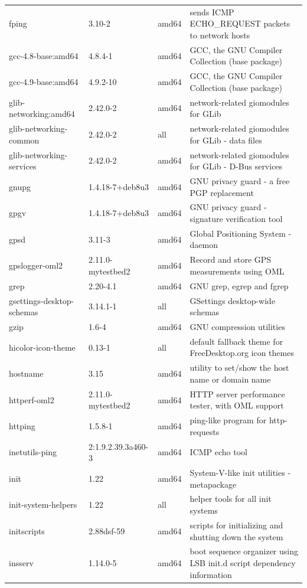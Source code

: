 \documentclass[a4paper,10pt]{article}
\begin{document}
\begin{appendices}
{\begin{longtable}{p{3.25cm}@{\hspace{0.25cm}}p{4cm}@{\hspace{0.25cm}}l@{\hspace{0.25cm}}p{7cm}}
fping	&	3.10-2	&	amd64	&	sends ICMP ECHO\_REQUEST packets to network hosts	\\
gcc-4.8-base:amd64	&	4.8.4-1	&	amd64	&	GCC, the GNU Compiler Collection (base package)	\\
gcc-4.9-base:amd64	&	4.9.2-10	&	amd64	&	GCC, the GNU Compiler Collection (base package)	\\
glib-networking:amd64	&	2.42.0-2	&	amd64	&	network-related giomodules for GLib	\\
glib-networking-common	&	2.42.0-2	&	all	&	network-related giomodules for GLib - data files	\\
glib-networking-services	&	2.42.0-2	&	amd64	&	network-related giomodules for GLib - D-Bus services	\\
gnupg	&	1.4.18-7+deb8u3	&	amd64	&	GNU privacy guard - a free PGP replacement	\\
gpgv	&	1.4.18-7+deb8u3	&	amd64	&	GNU privacy guard - signature verification tool	\\
gpsd	&	3.11-3	&	amd64	&	Global Positioning System - daemon	\\
gpslogger-oml2	&	2.11.0-mytestbed2	&	amd64	&	Record and store GPS measurements using OML	\\
grep	&	2.20-4.1	&	amd64	&	GNU grep, egrep and fgrep	\\
gsettings-desktop-schemas	&	3.14.1-1	&	all	&	GSettings desktop-wide schemas	\\
gzip	&	1.6-4	&	amd64	&	GNU compression utilities	\\
hicolor-icon-theme	&	0.13-1	&	all	&	default fallback theme for FreeDesktop.org icon themes	\\
hostname	&	3.15	&	amd64	&	utility to set/show the host name or domain name	\\
httperf-oml2	&	2.11.0-mytestbed2	&	amd64	&	HTTP server performance tester, with OML support	\\
httping	&	1.5.8-1	&	amd64	&	ping-like program for http-requests	\\
inetutils-ping	&	2:1.9.2.39.3a460-3	&	amd64	&	ICMP echo tool	\\
init	&	1.22	&	amd64	&	System-V-like init utilities - metapackage	\\
init-system-helpers	&	1.22	&	all	&	helper tools for all init systems	\\
initscripts	&	2.88dsf-59	&	amd64	&	scripts for initializing and shutting down the system	\\
insserv	&	1.14.0-5	&	amd64	&	boot sequence organizer using LSB init.d script dependency information	\\

\end{longtable}}
\end{appendices}
\end{document}
